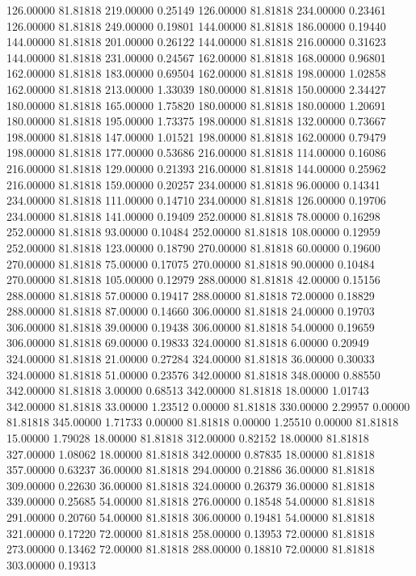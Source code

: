 126.00000 81.81818 219.00000 0.25149
126.00000 81.81818 234.00000 0.23461
126.00000 81.81818 249.00000 0.19801
144.00000 81.81818 186.00000 0.19440
144.00000 81.81818 201.00000 0.26122
144.00000 81.81818 216.00000 0.31623
144.00000 81.81818 231.00000 0.24567
162.00000 81.81818 168.00000 0.96801
162.00000 81.81818 183.00000 0.69504
162.00000 81.81818 198.00000 1.02858
162.00000 81.81818 213.00000 1.33039
180.00000 81.81818 150.00000 2.34427
180.00000 81.81818 165.00000 1.75820
180.00000 81.81818 180.00000 1.20691
180.00000 81.81818 195.00000 1.73375
198.00000 81.81818 132.00000 0.73667
198.00000 81.81818 147.00000 1.01521
198.00000 81.81818 162.00000 0.79479
198.00000 81.81818 177.00000 0.53686
216.00000 81.81818 114.00000 0.16086
216.00000 81.81818 129.00000 0.21393
216.00000 81.81818 144.00000 0.25962
216.00000 81.81818 159.00000 0.20257
234.00000 81.81818 96.00000 0.14341
234.00000 81.81818 111.00000 0.14710
234.00000 81.81818 126.00000 0.19706
234.00000 81.81818 141.00000 0.19409
252.00000 81.81818 78.00000 0.16298
252.00000 81.81818 93.00000 0.10484
252.00000 81.81818 108.00000 0.12959
252.00000 81.81818 123.00000 0.18790
270.00000 81.81818 60.00000 0.19600
270.00000 81.81818 75.00000 0.17075
270.00000 81.81818 90.00000 0.10484
270.00000 81.81818 105.00000 0.12979
288.00000 81.81818 42.00000 0.15156
288.00000 81.81818 57.00000 0.19417
288.00000 81.81818 72.00000 0.18829
288.00000 81.81818 87.00000 0.14660
306.00000 81.81818 24.00000 0.19703
306.00000 81.81818 39.00000 0.19438
306.00000 81.81818 54.00000 0.19659
306.00000 81.81818 69.00000 0.19833
324.00000 81.81818 6.00000 0.20949
324.00000 81.81818 21.00000 0.27284
324.00000 81.81818 36.00000 0.30033
324.00000 81.81818 51.00000 0.23576
342.00000 81.81818 348.00000 0.88550
342.00000 81.81818 3.00000 0.68513
342.00000 81.81818 18.00000 1.01743
342.00000 81.81818 33.00000 1.23512
0.00000 81.81818 330.00000 2.29957
0.00000 81.81818 345.00000 1.71733
0.00000 81.81818 0.00000 1.25510
0.00000 81.81818 15.00000 1.79028
18.00000 81.81818 312.00000 0.82152
18.00000 81.81818 327.00000 1.08062
18.00000 81.81818 342.00000 0.87835
18.00000 81.81818 357.00000 0.63237
36.00000 81.81818 294.00000 0.21886
36.00000 81.81818 309.00000 0.22630
36.00000 81.81818 324.00000 0.26379
36.00000 81.81818 339.00000 0.25685
54.00000 81.81818 276.00000 0.18548
54.00000 81.81818 291.00000 0.20760
54.00000 81.81818 306.00000 0.19481
54.00000 81.81818 321.00000 0.17220
72.00000 81.81818 258.00000 0.13953
72.00000 81.81818 273.00000 0.13462
72.00000 81.81818 288.00000 0.18810
72.00000 81.81818 303.00000 0.19313
